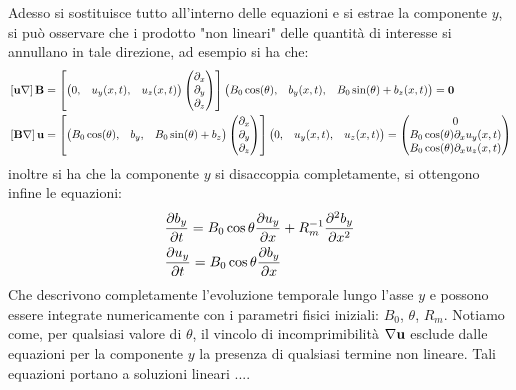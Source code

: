 Adesso si sostituisce tutto all'interno delle equazioni e si estrae la componente $y$, si può osservare che i prodotto "non lineari" delle quantità di interesse si annullano in tale direzione, ad esempio si ha che:
\begin{align*}
     & \left[\vv{u}\nabla\right]\vv{B} =
    \left[\begin{pmatrix}
                  0, & u_y(x, t), & u_z(x, t)
              \end{pmatrix}
        \begin{pmatrix}
            \partial_x \\ \partial_y \\ \partial_z
        \end{pmatrix}\right]
    \begin{pmatrix}
        B_0 \cos(\theta), & b_{y}(x, t), & B_0 \sin(\theta) + b_{z}(x, t)
    \end{pmatrix} = \vv{0} \\
     & \left[\vv{B}\nabla\right]\vv{u} =
    \left[\begin{pmatrix}
                  B_0 \cos(\theta), & b_{y}, & B_0 \sin(\theta) + b_{z}
              \end{pmatrix}
        \begin{pmatrix}
            \partial_x \\ \partial_y \\ \partial_z
        \end{pmatrix}\right]\begin{pmatrix}
                            0, & u_{y}(x, t), & u_{z}(x, t)
                        \end{pmatrix}
    = \begin{pmatrix}
          0                                       \\
          B_0 \cos(\theta) \partial_x   u_y(x, t) \\
          B_0 \cos(\theta) \partial_x   u_z(x, t)
      \end{pmatrix}
\end{align*}
inoltre si ha che la componente $y$ si disaccoppia completamente, si ottengono infine le equazioni:
\begin{align}
     & \frac{\partial b_{y}}{\partial t}
    =
    B_0 \cos\theta \frac{\partial u_{y}}{\partial x}
    + R_m^{-1} \frac{\partial^2 b_{y}}{\partial x^2}               \\
     & \frac{\partial u_{y}}{\partial t} = B_0 \cos\theta \frac{\partial b_y}{\partial x}
\end{align}
Che descrivono completamente l'evoluzione temporale lungo l'asse $y$ e possono essere integrate numericamente con i parametri fisici iniziali:
$B_0$, $\theta$, $R_m$. 
Notiamo come, per qualsiasi valore di $\theta$, il vincolo di incomprimibilità $\nabla \vv{u}$ esclude dalle equazioni per la componente $y$ la presenza di qualsiasi termine non lineare.
Tali equazioni portano a soluzioni lineari ....


